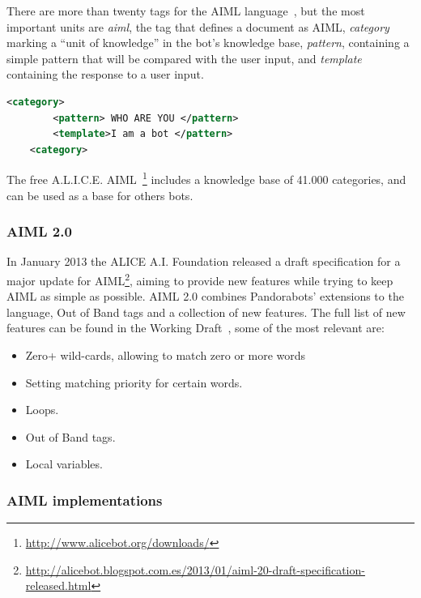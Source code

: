 There are more than twenty tags for the AIML language~\cite{aliceaiml}, but the most important units are \emph{aiml}, the tag that defines a document as \ac{AIML}, \emph{category} marking a ``unit of knowledge'' in the bot's knowledge base, \emph{pattern}, containing a simple pattern that will be compared with the user input, and \emph{template} containing the response to a user input.

\begin{center} 
  \begin{lstlisting}[language=XML, captionpos=b, caption=Example AIML code, label=listing:exampleaiml]   
    <category>
        <pattern> WHO ARE YOU </pattern>
        <template>I am a bot </pattern>
    <category>
 \end{lstlisting}
\end{center}
The free A.L.I.C.E. \ac{AIML}~\footnote{\url{http://www.alicebot.org/downloads/}} includes a knowledge base of 41.000 categories, and can be used as a base for others bots.

\subsubsection{\ac{AIML} 2.0}

In January 2013 the ALICE A.I. Foundation released a draft specification for a major update for \ac{AIML}\footnote{\url{http://alicebot.blogspot.com.es/2013/01/aiml-20-draft-specification-released.html}}, aiming to provide new features while trying to keep \ac{AIML} as simple as possible. \ac{AIML} 2.0 combines Pandorabots' extensions to the language, Out of Band tags and a collection of new features. The full list of new features can be found in the Working Draft~\cite{aiml20draft}, some of the most relevant are:

\begin{itemize}%
  \item Zero+ wild-cards, allowing to match zero or more words
  \item Setting matching priority for certain words.
  \item Loops.
  \item Out of Band tags.
  \item Local variables.
\end{itemize}

\subsubsection{\ac{AIML} implementations}

